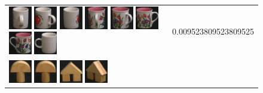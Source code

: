 \begin{figure}[bp]
\begin{tabular}{m{11cm} | m{3cm} |}
\includegraphics[width=1cm]{coil/beeld-41.eps}
\includegraphics[width=1cm]{coil/beeld-40.eps}
\includegraphics[width=1cm]{coil/beeld-38.eps}
\includegraphics[width=1cm]{coil/beeld-11.eps}
\includegraphics[width=1cm]{coil/beeld-10.eps}
\includegraphics[width=1cm]{coil/beeld-6.eps}
\includegraphics[width=1cm]{coil/beeld-7.eps}
\includegraphics[width=1cm]{coil/beeld-37.eps}
& {\scriptsize 0.009523809523809525}
\\
\includegraphics[width=1cm]{coil/beeld-0.eps}
\includegraphics[width=1cm]{coil/beeld-1.eps}
\includegraphics[width=1cm]{coil/beeld-42.eps}
\includegraphics[width=1cm]{coil/beeld-46.eps}

\end{tabular}
\end{figure}
